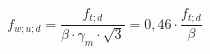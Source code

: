 \documentclass[12pt]{article}
\begin{document}
\begin{displaymath}
f_{w;u;d} = \frac {f_{t;d}} {\beta \cdot \gamma_m \cdot \sqrt {3}} = 0,46 \cdot \frac {f_{t;d}} {\beta}
\end{displaymath}
\end{document}
